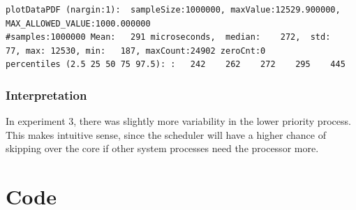 \documentclass{article}
\begin{document}
\begin{lstlisting}
plotDataPDF (nargin:1):  sampleSize:1000000, maxValue:12529.900000,  MAX_ALLOWED_VALUE:1000.000000
#samples:1000000 Mean:   291 microseconds,  median:    272,  std:     77, max: 12530, min:   187, maxCount:24902 zeroCnt:0
percentiles (2.5 25 50 75 97.5): :   242    262    272    295    445	
\end{lstlisting}

\subsubsection{Interpretation}

In experiment 3, there was slightly more variability in the lower priority
process. This makes intuitive sense, since the scheduler will have a higher
chance of skipping over the core if other system processes need the processor
more.

\section{Code}








\end{document}
